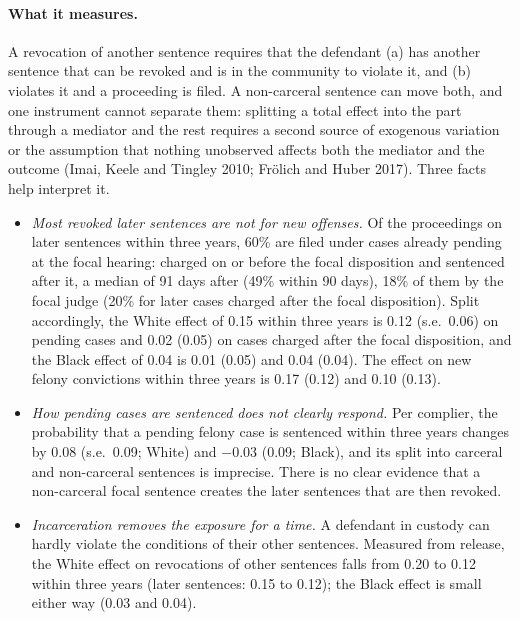 \documentclass[11pt]{article}
\begin{document}
\paragraph{What it measures.} A revocation of another sentence requires that the defendant (a) has another sentence that can be revoked and is in the community to violate it, and (b) violates it and a proceeding is filed. A non-carceral sentence can move both, and one instrument cannot separate them: splitting a total effect into the part through a mediator and the rest requires a second source of exogenous variation or the assumption that nothing unobserved affects both the mediator and the outcome (Imai, Keele and Tingley 2010; Frölich and Huber 2017). Three facts help interpret it.
\begin{itemize}
  \item \emph{Most revoked later sentences are not for new offenses.} Of the proceedings on later sentences within three years, 60\% are filed under cases already pending at the focal hearing: charged on or before the focal disposition and sentenced after it, a median of 91 days after (49\% within 90 days), 18\% of them by the focal judge (20\% for later cases charged after the focal disposition). Split accordingly, the White effect of 0.15 within three years is 0.12 (s.e.\ 0.06) on pending cases and 0.02 (0.05) on cases charged after the focal disposition, and the Black effect of 0.04 is 0.01 (0.05) and 0.04 (0.04). The effect on new felony convictions within three years is 0.17 (0.12) and 0.10 (0.13).
  \item \emph{How pending cases are sentenced does not clearly respond.} Per complier, the probability that a pending felony case is sentenced within three years changes by 0.08 (s.e.\ 0.09; White) and $-0.03$ (0.09; Black), and its split into carceral and non-carceral sentences is imprecise. There is no clear evidence that a non-carceral focal sentence creates the later sentences that are then revoked.
  \item \emph{Incarceration removes the exposure for a time.} A defendant in custody can hardly violate the conditions of their other sentences. Measured from release, the White effect on revocations of other sentences falls from 0.20 to 0.12 within three years (later sentences: 0.15 to 0.12); the Black effect is small either way (0.03 and 0.04).
\end{itemize}
\end{document}
